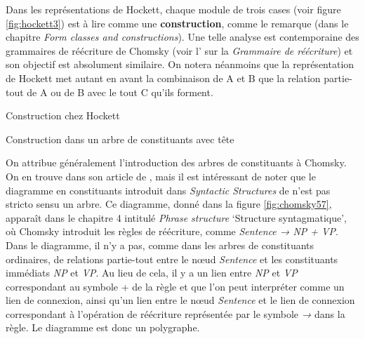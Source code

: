 { 
    Dans les représentations de Hockett, chaque module de trois cases (voir figure \ref{fig:hockett3}) est à lire comme une \textbf{construction}, comme le remarque \citet{hockett1958course} (dans le chapitre \textit{Form classes and constructions}). Une telle analyse est contemporaine des grammaires de réécriture de Chomsky (voir l’ sur la \textit{Grammaire de réécriture}) et son objectif est absolument similaire. On notera néanmoins que la représentation de Hockett met autant en avant la combinaison de A et B que la relation partie-tout de A ou de B avec le tout C qu’ils forment.

    \ea\label{fig:hockett3}
    \ea Construction chez Hockett\smallskip\\
    
    \ex Construction dans un arbre de constituants avec tête\smallskip\\
    \z
    \z
{}

    

    On attribue généralement l’introduction des arbres de constituants à Chomsky. On en trouve dans son article de \citeyear{chomsky1955three}, mais il est intéressant de noter que le diagramme en constituants introduit dans \textit{Syntactic Structures} de \citeyear{chomsky1957syntactic} n’est pas stricto sensu un arbre. Ce diagramme, donné dans la figure \ref{fig:chomsky57}, apparaît dans le chapitre 4 intitulé \textit{Phrase structure} ‘Structure syntagmatique’, où Chomsky introduit les règles de réécriture, comme \textit{Sentence → NP + VP}. Dans le diagramme, il n’y a pas, comme dans les arbres de constituants ordinaires, de relations partie-tout entre le nœud \textit{Sentence} et les constituants immédiats \textit{NP} et \textit{VP}. Au lieu de cela, il y a un lien entre \textit{NP} et \textit{VP} correspondant au symbole + de la règle et que l’on peut interpréter comme un lien de connexion, ainsi qu’un lien entre le nœud \textit{Sentence} et le lien de connexion correspondant à l’opération de réécriture représentée par le symbole \textit{→} dans la règle. Le diagramme est donc un polygraphe.

}
